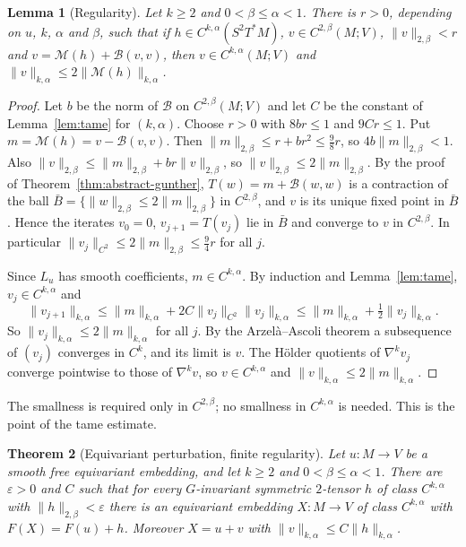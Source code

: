 \documentclass[11pt]{amsart}
\newtheorem{theorem}{Theorem}[section]
\newtheorem{lemma}[theorem]{Lemma}
\theoremstyle{definition}
\newcommand{\cM}{\mathcal{M}}
\newcommand{\cB}{\mathcal{B}}
\begin{document}
\begin{lemma}[Regularity]\label{lem:finite-regularity}
Let $k\ge2$ and $0<\beta\le\alpha<1$. There is $r>0$, depending on $u$, $k$, $\alpha$ and $\beta$,
such that if $h\in C^{k,\alpha}(S^2T^*M)$, $v\in C^{2,\beta}(M;V)$, $\|v\|_{2,\beta}<r$ and
$v=\cM(h)+\cB(v,v)$, then $v\in C^{k,\alpha}(M;V)$ and
$\|v\|_{k,\alpha}\le2\|\cM(h)\|_{k,\alpha}$.
\end{lemma}

\begin{proof}
Let $b$ be the norm of $\cB$ on $C^{2,\beta}(M;V)$ and let $C$ be the constant of
Lemma~\ref{lem:tame} for $(k,\alpha)$. Choose $r>0$ with $8br\le1$ and $9Cr\le1$. Put
$m=\cM(h)=v-\cB(v,v)$. Then $\|m\|_{2,\beta}\le r+br^2\le\tfrac98r$, so $4b\|m\|_{2,\beta}<1$. Also
$\|v\|_{2,\beta}\le\|m\|_{2,\beta}+br\|v\|_{2,\beta}$, so $\|v\|_{2,\beta}\le2\|m\|_{2,\beta}$. By
the proof of Theorem~\ref{thm:abstract-gunther}, $T(w)=m+\cB(w,w)$ is a contraction of the ball
$\bar B=\{\|w\|_{2,\beta}\le2\|m\|_{2,\beta}\}$ in $C^{2,\beta}$, and $v$ is its unique fixed point
in $\bar B$. Hence the iterates $v_0=0$, $v_{j+1}=T(v_j)$ lie in $\bar B$ and converge to $v$ in
$C^{2,\beta}$. In particular $\|v_j\|_{C^2}\le2\|m\|_{2,\beta}\le\tfrac94r$ for all $j$.

Since $L_u$ has smooth coefficients, $m\in C^{k,\alpha}$. By induction and Lemma~\ref{lem:tame},
$v_j\in C^{k,\alpha}$ and
\[
\|v_{j+1}\|_{k,\alpha}\le\|m\|_{k,\alpha}+2C\|v_j\|_{C^2}\|v_j\|_{k,\alpha}
\le\|m\|_{k,\alpha}+\tfrac12\|v_j\|_{k,\alpha}.
\]
So $\|v_j\|_{k,\alpha}\le2\|m\|_{k,\alpha}$ for all $j$. By the Arzel\`a--Ascoli theorem a
subsequence of $(v_j)$ converges in $C^k$, and its limit is $v$. The H\"older quotients of
$\nabla^kv_j$ converge pointwise to those of $\nabla^kv$, so $v\in C^{k,\alpha}$ and
$\|v\|_{k,\alpha}\le2\|m\|_{k,\alpha}$.
\end{proof}

The smallness is required only in $C^{2,\beta}$; no smallness in $C^{k,\alpha}$ is needed. This is
the point of the tame estimate.

\begin{theorem}[Equivariant perturbation, finite regularity]\label{thm:finite-perturbation}
Let $u\colon M\to V$ be a smooth free equivariant embedding, and let $k\ge2$ and
$0<\beta\le\alpha<1$. There are $\varepsilon>0$ and $C$ such that for every $G$-invariant symmetric
$2$-tensor $h$ of class $C^{k,\alpha}$ with $\|h\|_{2,\beta}<\varepsilon$ there is an equivariant
embedding $X\colon M\to V$ of class $C^{k,\alpha}$ with $F(X)=F(u)+h$. Moreover $X=u+v$ with
$\|v\|_{k,\alpha}\le C\|h\|_{k,\alpha}$.
\end{theorem}
\end{document}
